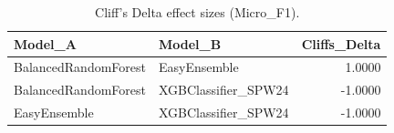 \begin{table}[t]
\centering
\begin{tabular}{llr}
\toprule
Model_A & Model_B & Cliffs_Delta \\
\midrule
BalancedRandomForest & EasyEnsemble & 1.0000 \\
BalancedRandomForest & XGBClassifier_SPW24 & -1.0000 \\
EasyEnsemble & XGBClassifier_SPW24 & -1.0000 \\
\bottomrule
\end{tabular}
\caption{Cliff's Delta effect sizes (Micro_F1).}
\label{tab:cliffs_Micro_F1}
\end{table}
